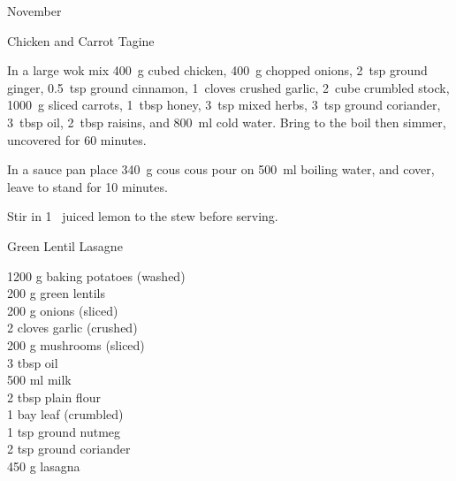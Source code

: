 \begin{menu}{November}
\begin{recipe}{2}{Chicken and Carrot Tagine}
    \begin{instructions}
    \item 
        In a large wok mix
        400~g cubed chicken,
        400~g chopped onions,
        2~tsp  ground ginger,
        0.5~tsp  ground cinnamon,
        1~cloves crushed garlic,
        2~cube crumbled stock,
        1000~g sliced carrots,
        1~tbsp  honey,
        3~tsp  mixed herbs,
        3~tsp  ground coriander,
        3~tbsp  oil,
        2~tbsp  raisins,
        and
        800~ml  cold water.
        Bring to the boil
        then simmer, uncovered for 60 minutes.
      \item 
    In a
    sauce pan 
    place
    340~g  cous cous
    pour on
    500~ml  boiling water,
    and cover, leave to stand for 10 minutes.
  \item 
        Stir in
        1~ juiced lemon
        to the stew
        before serving.
      
    \end{instructions}
    \end{recipe}%
  
    \begin{recipe}{2}{Green Lentil Lasagne}%
		\begin{ingredients}
		1200 g baking potatoes (washed) \\
	200 g green lentils  \\
	200 g onions (sliced) \\
	2 cloves garlic (crushed) \\
	200 g mushrooms (sliced) \\
	3 tbsp oil  \\
	500 ml milk  \\
	2 tbsp plain flour  \\
	1  bay leaf (crumbled) \\
	1 tsp ground nutmeg  \\
	2 tsp ground coriander  \\
	450 g lasagna  \\
	
		\end{ingredients}
	
	

\end{recipe}
\end{menu}
